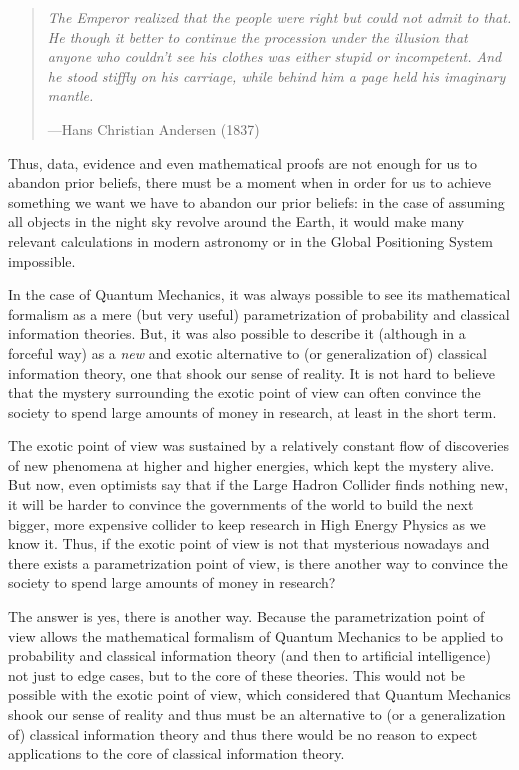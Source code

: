 \documentclass[11pt]{book}
\begin{document}
\begin{quote}
\emph{The Emperor realized that the people were right but could not
admit to that. He though it better to continue the procession under the
illusion that anyone who couldn't see his clothes was either stupid or
incompetent. And he stood stiffly on his carriage, while behind him a
page held his imaginary mantle.}

---Hans Christian Andersen (1837)
\end{quote}

Thus, data, evidence and even mathematical proofs are not enough for us
to abandon prior beliefs, there must be a moment when in order for us to
achieve something we want we have to abandon our prior beliefs: in the
case of assuming all objects in the night sky revolve around the Earth,
it would make many relevant calculations in modern astronomy or in the
Global Positioning System impossible.

In the case of Quantum Mechanics, it was always possible to see its
mathematical formalism as a mere (but very useful) parametrization of
probability and classical information
theories\cite{Spekkens_2007}. But, it
was also possible to describe it (although in a forceful way) as a
\emph{new} and exotic alternative to (or generalization of) classical
information theory, one that shook our sense of reality. It is not hard
to believe that the mystery surrounding the exotic point of view can
often convince the society to spend large amounts of money in research,
at least in the short term.

The exotic point of view was sustained by a relatively constant flow of
discoveries of new phenomena at higher and higher energies, which kept
the mystery alive. But now, even optimists say that if the Large Hadron
Collider finds nothing new, it will be harder to convince the
governments of the world to build the next bigger, more expensive
collider to keep research in High Energy Physics as we know
it\cite{nightmare}. Thus, if the exotic
point of view is not that mysterious nowadays and there exists a
parametrization point of view, is there another way to convince the
society to spend large amounts of money in research?

The answer is yes, there is another way. Because the parametrization
point of view allows the mathematical formalism of Quantum Mechanics to
be applied to probability and classical information theory (and then to
artificial intelligence) not just to edge cases, but to the core of
these theories. This would not be possible with the exotic point of
view, which considered that Quantum Mechanics shook our sense of reality
and thus must be an alternative to (or a generalization of) classical
information theory and thus there would be no reason to expect
applications to the core of classical information theory.
\end{document}
